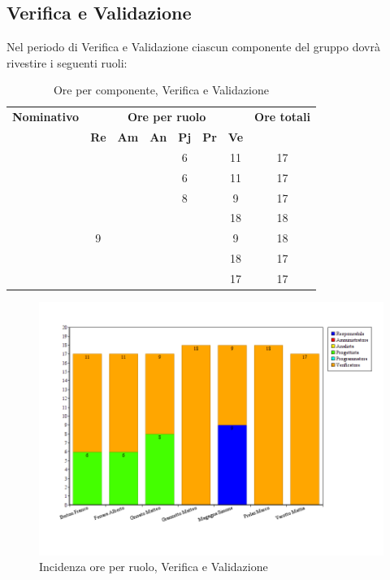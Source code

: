 \subsection{Verifica e Validazione}
Nel periodo di Verifica e Validazione ciascun componente del gruppo dovrà rivestire i seguenti ruoli:
\begin{table}[H]
	\begin{center}
		\begin{tabular}{|c|c|c|c|c|c|c|c|}
			\hline
			\textbf{Nominativo} & \multicolumn{6}{c|}{\textbf{Ore per ruolo}} & \textbf{Ore totali} \\
			& \textbf{Re} & \textbf{Am} & \textbf{An} & \textbf{Pj} & \textbf{Pr} & \textbf{Ve} & \\
			\hline
			\FB		&		&		&		&	6	&		&	11	&	17	\\
			\hline
			\AF		&		&		&		&	 6	&		&	11	& 	17	\\
			\hline	
			\GN		&		&		&		&	8	&		&	9	&	17	\\
			\hline								
			\GR	&		&	 	&		&		&	 	& 	18	&	18	\\
			\hline
			\SM 		&	9	&		&		&		&		& 	9	&	18	\\
			\hline	
			\MP 		& 		&		&		&		&		&	18	&	17	\\
			\hline					
			\MV 		&		&		&		&		&		&	17	& 	17	\\
			\hline
		\end{tabular}
	\end{center}
	\caption{Ore per componente, Verifica e Validazione}
\end{table}

\begin{figure}[H]
	\centering
	\includegraphics[scale=0.4]{immagini/Grafi/GrafoVV}
	\caption{Incidenza ore per ruolo, Verifica e Validazione}
\end{figure}

